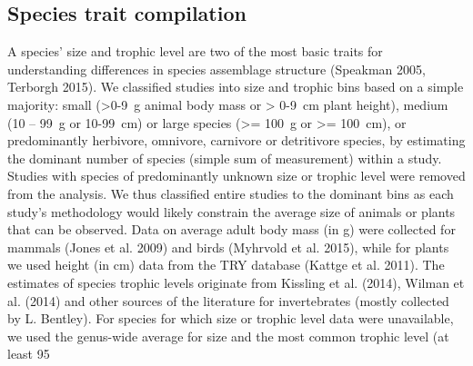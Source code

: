 \subsection{Species trait compilation}
A species’ size and trophic level are two of the most basic traits for understanding differences in species assemblage structure (Speakman 2005, Terborgh 2015). We classified studies into size and trophic bins based on a simple majority: small (>0-9 g animal body mass or > 0-9 cm plant height), medium (10 – 99 g or 10-99 cm) or large species (>= 100 g or >= 100 cm), or predominantly herbivore, omnivore, carnivore or detritivore species, by estimating the dominant number of species (simple sum of measurement) within a study. Studies with species of predominantly unknown size or trophic level were removed from the analysis. We thus classified entire studies to the dominant bins as each study’s methodology would likely constrain the average size of animals or plants that can be observed. Data on average adult body mass (in g) were collected for mammals (Jones et al. 2009) and birds (Myhrvold et al. 2015), while for plants we used height (in cm) data from the TRY database (Kattge et al. 2011). The estimates of species trophic levels originate from Kissling et al. (2014), Wilman et al. (2014) and other sources of the literature for invertebrates (mostly collected by L. Bentley). For species for which size or trophic level data were unavailable, we used the genus-wide average for size and the most common trophic level (at least 95 %

